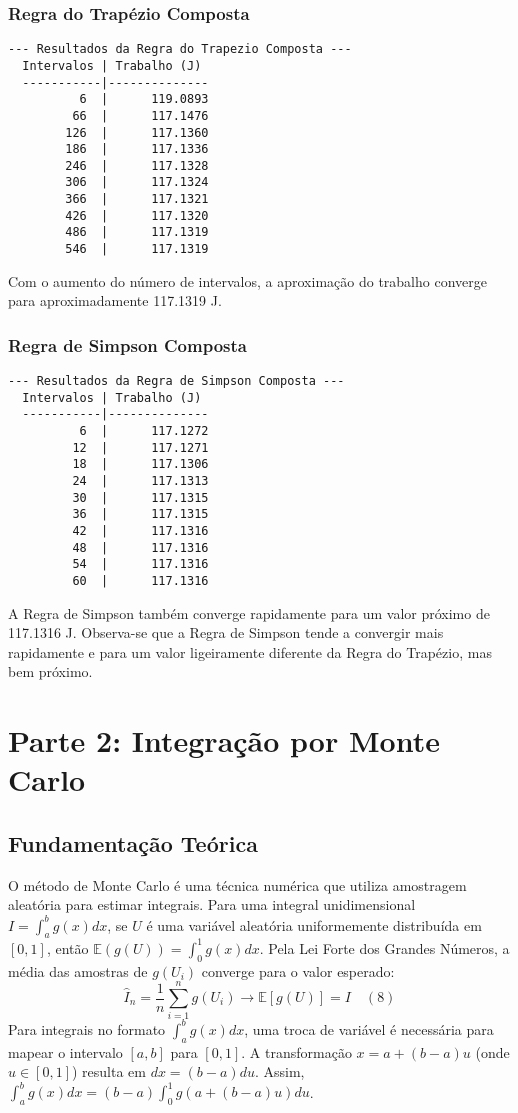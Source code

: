 \documentclass{article}
\begin{document}
\subsubsection{Regra do Trapézio Composta}
\begin{verbatim}
--- Resultados da Regra do Trapezio Composta ---
  Intervalos | Trabalho (J)
  -----------|--------------
          6  |      119.0893
         66  |      117.1476
        126  |      117.1360
        186  |      117.1336
        246  |      117.1328
        306  |      117.1324
        366  |      117.1321
        426  |      117.1320
        486  |      117.1319
        546  |      117.1319
\end{verbatim}
Com o aumento do número de intervalos, a aproximação do trabalho converge para aproximadamente 117.1319 J.

\subsubsection{Regra de Simpson Composta}
\begin{verbatim}
--- Resultados da Regra de Simpson Composta ---
  Intervalos | Trabalho (J)
  -----------|--------------
          6  |      117.1272
         12  |      117.1271
         18  |      117.1306
         24  |      117.1313
         30  |      117.1315
         36  |      117.1315
         42  |      117.1316
         48  |      117.1316
         54  |      117.1316
         60  |      117.1316
\end{verbatim}
A Regra de Simpson também converge rapidamente para um valor próximo de 117.1316 J. Observa-se que a Regra de Simpson tende a convergir mais rapidamente e para um valor ligeiramente diferente da Regra do Trapézio, mas bem próximo.

\section{Parte 2: Integração por Monte Carlo}

\subsection{Fundamentação Teórica}
O método de Monte Carlo é uma técnica numérica que utiliza amostragem aleatória para estimar integrais. Para uma integral unidimensional $I=\int_{a}^{b}g(x)dx$, se $U$ é uma variável aleatória uniformemente distribuída em $[0,1]$, então $\mathbb{E}(g(U)) = \int_{0}^{1}g(x)dx$. Pela Lei Forte dos Grandes Números, a média das amostras de $g(U_i)$ converge para o valor esperado:
$$ \hat{I}_n = \frac{1}{n}\sum_{i=1}^{n}g(U_i) \rightarrow \mathbb{E}[g(U)] = I \quad (8)$$
Para integrais no formato $\int_{a}^{b}g(x)dx$, uma troca de variável é necessária para mapear o intervalo $[a,b]$ para $[0,1]$. A transformação $x = a + (b-a)u$ (onde $u \in [0,1]$) resulta em $dx = (b-a)du$. Assim, $\int_{a}^{b}g(x)dx = (b-a)\int_{0}^{1}g(a+(b-a)u)du$.
\end{document}
